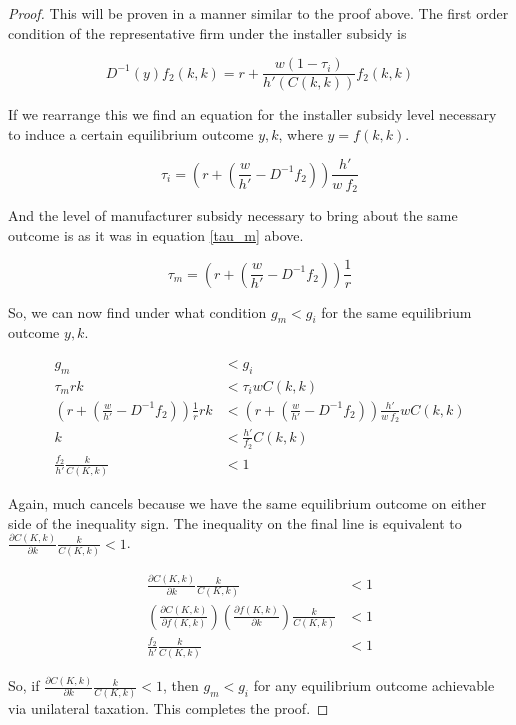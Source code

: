 \documentclass{article}
\begin{document}
\begin{proof}
This will be proven in a manner similar to the proof above. The first order condition of the representative firm under the installer subsidy is

\[
D^{-1}(y) f_2(k,k) = r + \frac{w(1-\tau_i)}{h'(C(k,k))} f_2 (k,k)
\]

If we rearrange this we find an equation for the installer subsidy level necessary to induce a certain equilibrium outcome $y, k$, where $y = f(k,k)$.

\begin{equation}
\tau_i = \left(r + \left( \frac{w}{h'} - D^{-1} f_2 \right) \right) \frac{h'}{w\: f_2}
\label{tau_i}
\end{equation}

And the level of manufacturer subsidy necessary to bring about the same outcome is as it was in equation \ref{tau_m} above.

\[
\tau_m = \left(r + \left( \frac{w}{h'} - D^{-1} f_2 \right) \right) \frac{1}{r}
\]

So, we can now find under what condition $g_m < g_i$ for the same equilibrium outcome $y,k$. 

\begin{align*}
g_m &< g_i \\
\tau_m r k &< \tau_i w C(k,k) \\
\left(r + \left( \frac{w}{h'} - D^{-1} f_2 \right) \right) \frac{1}{r} r k &< \left(r + \left( \frac{w}{h'} - D^{-1} f_2 \right) \right) \frac{h'}{w\: f_2} w C(k,k) \\
k &< \frac{h'}{f_2} C(k,k) \\
\frac{f_2}{h'} \frac{k}{C(K,k)} &< 1
\end{align*}

Again, much cancels because we have the same equilibrium outcome on either side of the inequality sign. The inequality on the final line is equivalent to $\frac{\partial C(K,k)}{\partial k} \frac{k}{C(K,k)}  < 1$.

\begin{align*}
\frac{\partial C(K,k)}{\partial k} \frac{k}{C(K,k)}  &< 1 \\
\left( \frac{\partial C(K,k) }{\partial f(K,k)} \right) \left(\frac{\partial f(K,k)}{\partial k} \right)\frac{k}{C(K,k)} &< 1\\
\frac{f_2}{h'} \frac{k}{C(K,k)} &< 1
\end{align*}

So, if $\frac{\partial C(K,k)}{\partial k} \frac{k}{C(K,k)}  < 1$, then $g_m < g_i$ for any equilibrium outcome achievable via unilateral taxation. This completes the proof.
\end{proof}
\end{document}
